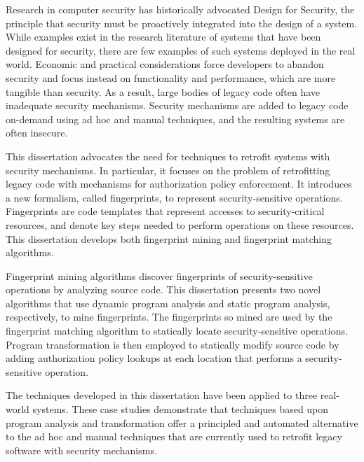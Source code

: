 Research in computer security has historically advocated Design for Security,
the principle that security must be proactively integrated into the design of a
system. While examples exist in the research literature of systems that have
been designed for security, there are few examples of such systems deployed in
the real world. Economic and practical considerations force developers to
abandon security and focus instead on functionality and performance, which are
more tangible than security. As a result, large bodies of legacy code often
have inadequate security mechanisms.  Security mechanisms are added to legacy
code on-demand using ad hoc and manual techniques, and the resulting systems
are often insecure.

This dissertation advocates the need for techniques to retrofit systems with
security mechanisms. In particular, it focuses on the problem of retrofitting
legacy code with mechanisms for authorization policy enforcement. It introduces
a new formalism, called fingerprints, to represent security-sensitive
operations. Fingerprints are code templates that represent accesses to
security-critical resources, and denote key steps needed to perform operations
on these resources. This dissertation develops both fingerprint mining and
fingerprint matching algorithms.

Fingerprint mining algorithms discover fingerprints of security-sensitive
operations by analyzing source code. This dissertation presents two novel
algorithms that use dynamic program analysis and static program analysis,
respectively, to mine fingerprints. The fingerprints so mined are used by the
fingerprint matching algorithm to statically locate security-sensitive
operations. Program transformation is then employed to statically modify source
code by adding authorization policy lookups at each location that performs a
security-sensitive operation.

The techniques developed in this dissertation have been applied to three
real-world systems. These case studies demonstrate that techniques based upon
program analysis and transformation offer a principled and automated
alternative to the ad hoc and manual techniques that are currently used to
retrofit legacy software with security mechanisms.
